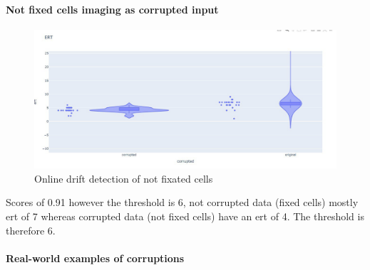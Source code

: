 \paragraph{Not fixed cells imaging as corrupted input}
    \begin{figure}[H]
        \begin{center}
            \includegraphics[width=0.5\linewidth]{bilder/drift-detection/online-fixed-vs-not-fixed.jpg}
            \caption{Online drift detection of not fixated cells}\label{fig:online-drift-not-fixed}
        \end{center}
    \end{figure}

    Scores of 0.91 however the threshold is 6, not corrupted data (fixed cells) mostly ert of 7 whereas corrupted data (not fixed cells) have an ert of 4. The threshold is therefore 6.

\paragraph{Real-world examples of corruptions}
